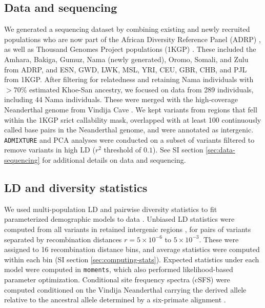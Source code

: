 \documentclass[]{article}
\begin{document}
\subsection*{Data and sequencing}

We generated a sequencing dataset by combining existing and newly recruited
populations who are now part of the African Diversity Reference Panel (ADRP)
\citep{Gurdasani2015-qy,Pagani2015-pz}, as well as Thousand Genomes Project
populations (1KGP) \citep{1000_Genomes_Project_Consortium2015-zq}. These
included the Amhara, Bakiga, Gumuz, Nama (newly generated), Oromo, Somali, and
Zulu from ADRP, and ESN, GWD, LWK, MSL, YRI, CEU, GBR, CHB, and PJL from 1KGP.
After filtering for relatedness and retaining Nama individuals with $>70\%$
estimated Khoe-San ancestry, we focused on data from 289 individuals, including
44 Nama individuals. These were merged with the high-coverage Neanderthal
genome from Vindija Cave \citep{Prufer2017-kk}. We kept variants from regions
that fell within the 1KGP srict callability mask, overlapped with at least 100
continuously called base pairs in the Neanderthal genome, and were annotated as
intergenic. \texttt{ADMIXTURE} and PCA analyses were conducted on a subset of
variants filtered to remove variants in high LD ($r^2$ threshold of $0.1$). See
SI section \ref{sec:data-sequencing} for additional details on data and
sequencing.

\subsection*{LD and diversity statistics}

We used multi-population LD and pairwise diversity statistics to fit
parameterized demographic models to data \citep{Ragsdale2019-nt}. Unbiased LD
statistics were computed from all variants in retained intergenic regions
\citep{Ragsdale2020-nz}, for pairs of variants separated by recombination
distances $r = 5\times10^{-6}$ to $5\times10^{-3}$. These were assigned to 16
recombination distance bins, and average statistics were computed within each
bin (SI section \ref{sec:computing-stats}). Expected statistics under each model were computed
in \texttt{moments}, which also performed likelihood-based parameter
optimization. Conditional site frequency spectra (cSFS) were computed
conditioned on the Vindija Neanderthal carrying the derived allele relative to
the ancestral allele determined by a six-primate alignment
\citep{1000_Genomes_Project_Consortium2015-zq}.
\end{document}
